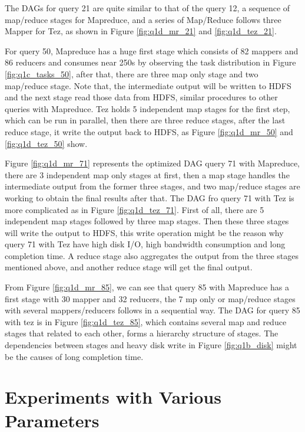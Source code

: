 \documentclass[10pt]{article}
\begin{document}
The DAGs for query 21 are quite similar to that of the query 12, a sequence of map/reduce stages for Mapreduce, and a series of Map/Reduce follows three Mapper for Tez, as shown in Figure \ref{fig:q1d_mr_21} and \ref{fig:q1d_tez_21}.

For query 50, Mapreduce has a huge first stage which consists of 82 mappers and 86 reducers and consumes near 250s by observing the task distribution in Figure \ref{fig:q1c_tasks_50}, after that, there are three map only stage and two map/reduce stage. Note that, the intermediate output will be written to HDFS and the next stage read those data from HDFS, similar procedures to other queries with Mapreduce. Tez holds 5 independent map stages for the first step, which can be run in parallel, then there are three reduce stages, after the last reduce stage, it write the output back to HDFS, as Figure \ref{fig:q1d_mr_50} and \ref{fig:q1d_tez_50} show.

Figure \ref{fig:q1d_mr_71} represents the optimized DAG query 71 with Mapreduce, there are 3 independent map only stages at first, then a map stage handles the intermediate output from the former three stages, and two map/reduce stages are working to obtain the final results after that. The DAG fro query 71 with Tez is more complicated as in Figure \ref{fig:q1d_tez_71}. First of all, there are 5 independent map stages followed by three map stages. Then these three stages will write the output to HDFS, this write operation might be the reason why query 71 with Tez have high disk I/O, high bandwidth consumption and long completion time. A reduce stage also aggregates the output from the three stages mentioned above, and another reduce stage will get the final output.

From Figure \ref{fig:q1d_mr_85}, we can see that query 85 with Mapreduce has a first stage with 30 mapper and 32 reducers, the 7 mp only or map/reduce stages with several mappers/reducers follows in a sequential way. The DAG for query 85 with tez is in Figure \ref{fig:q1d_tez_85}, which contains several map and reduce stages that related to each other, forms a hierarchy structure of stages. The dependencies between stages and heavy disk write in Figure \ref{fig:q1b_disk} might be the causes of long completion time.


\section{Experiments with Various Parameters}
\end{document}
